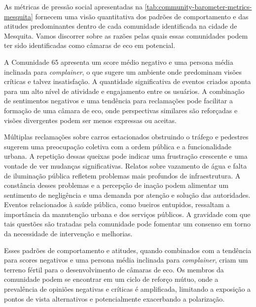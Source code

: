 As métricas de pressão social apresentadas na \autoref{tab:community-barometer-metrics-mesquita} fornecem uma visão quantitativa dos padrões de comportamento e das atitudes predominantes dentro de cada comunidade identificada na cidade de Mesquita. Vamos discorrer sobre as razões pelas quais essas comunidades podem ter sido identificadas como câmaras de eco em potencial.

A Comunidade 65 apresenta um score médio negativo e uma persona média inclinada para \textit{complainer}, o que sugere um ambiente onde predominam visões críticas e talvez insatisfação. A quantidade significativa de eventos criados aponta para um alto nível de atividade e engajamento entre os usuários. A combinação de sentimentos negativos e uma tendência para reclamações pode facilitar a formação de uma câmara de eco, onde perspectivas similares são reforçadas e visões divergentes podem ser menos expressas ou aceitas.

Múltiplas reclamações sobre carros estacionados obstruindo o tráfego e pedestres sugerem uma preocupação coletiva com a ordem pública e a funcionalidade urbana. A repetição dessas queixas pode indicar uma frustração crescente e uma vontade de ver mudanças significativas. Relatos sobre vazamento de água e falta de iluminação pública refletem problemas mais profundos de infraestrutura. A constância desses problemas e a percepção de inação podem alimentar um sentimento de negligência e uma demanda por atenção e solução das autoridades. Eventos relacionados à saúde pública, como bueiros entupidos, ressaltam a importância da manutenção urbana e dos serviços públicos. A gravidade com que tais questões são tratadas pela comunidade pode fomentar um consenso em torno da necessidade de intervenção e melhorias.

Esses padrões de comportamento e atitudes, quando combinados com a tendência para scores negativos e uma persona média inclinada para \textit{complainer}, criam um terreno fértil para o desenvolvimento de câmaras de eco. Os membros da comunidade podem se encontrar em um ciclo de reforço mútuo, onde a prevalência de opiniões negativas e críticas é amplificada, limitando a exposição a pontos de vista alternativos e potencialmente exacerbando a polarização.

